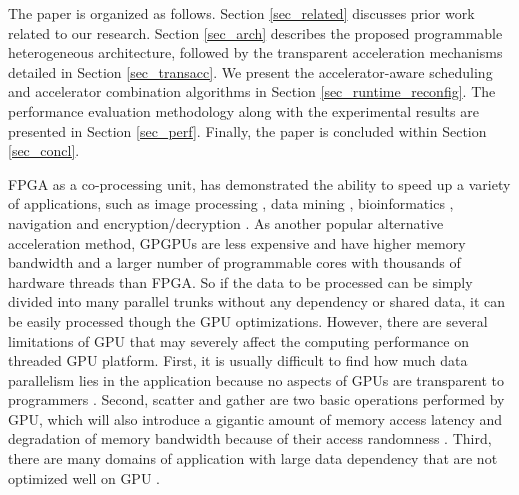 The paper is organized as follows. Section \ref{sec_related} discusses
prior work related to our research. Section \ref{sec_arch} describes
the proposed programmable heterogeneous architecture, followed by the
transparent acceleration mechanisms detailed in Section
\ref{sec_transacc}. We present the accelerator-aware scheduling and
accelerator combination algorithms in Section
\ref{sec_runtime_reconfig}. The performance evaluation methodology along with the
experimental results are presented in Section \ref{sec_perf}. Finally, the paper is
concluded within Section \ref{sec_concl}.

  FPGA as a
co-processing unit, has demonstrated the ability to speed up a variety
of applications, such as image processing \cite{imageacc}, data mining
\cite{data-mining-ref}, bioinformatics \cite{bioacc1} \cite{bioacc2},
navigation \cite{naviacc} and encryption/decryption
\cite{encryptionacc}. As another popular alternative acceleration
method, GPGPUs are less expensive and have higher memory bandwidth and
a larger number of programmable cores with thousands of hardware
threads than FPGA. So if the data to be processed can be simply
divided into many parallel trunks without any dependency or shared
data, it can be easily processed though the GPU
optimizations. However, there are several limitations of GPU that may
severely affect the computing performance on threaded GPU
platform. First, it is usually difficult to find how much data
parallelism lies in the application because no aspects of GPUs are
transparent to programmers \cite{microsoft06}. Second, scatter and
gather are two basic operations performed by GPU, which will also
introduce a gigantic amount of memory access latency and degradation
of memory bandwidth because of their access randomness
\cite{GPUlimit1}. Third, there are many domains of application with
large data dependency that are not optimized well on GPU
\cite{GPUlimit2}.  \fi
